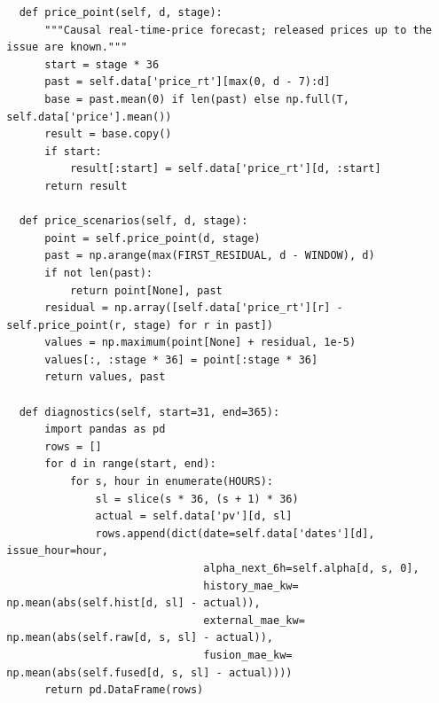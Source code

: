 \begin{verbatim}
    def price_point(self, d, stage):
        """Causal real-time-price forecast; released prices up to the
  issue are known."""
        start = stage * 36
        past = self.data['price_rt'][max(0, d - 7):d]
        base = past.mean(0) if len(past) else np.full(T,
  self.data['price'].mean())
        result = base.copy()
        if start:
            result[:start] = self.data['price_rt'][d, :start]
        return result

    def price_scenarios(self, d, stage):
        point = self.price_point(d, stage)
        past = np.arange(max(FIRST_RESIDUAL, d - WINDOW), d)
        if not len(past):
            return point[None], past
        residual = np.array([self.data['price_rt'][r] -
  self.price_point(r, stage) for r in past])
        values = np.maximum(point[None] + residual, 1e-5)
        values[:, :stage * 36] = point[:stage * 36]
        return values, past

    def diagnostics(self, start=31, end=365):
        import pandas as pd
        rows = []
        for d in range(start, end):
            for s, hour in enumerate(HOURS):
                sl = slice(s * 36, (s + 1) * 36)
                actual = self.data['pv'][d, sl]
                rows.append(dict(date=self.data['dates'][d],
  issue_hour=hour,
                                 alpha_next_6h=self.alpha[d, s, 0],
                                 history_mae_kw=
  np.mean(abs(self.hist[d, sl] - actual)),
                                 external_mae_kw=
  np.mean(abs(self.raw[d, s, sl] - actual)),
                                 fusion_mae_kw=
  np.mean(abs(self.fused[d, s, sl] - actual))))
        return pd.DataFrame(rows)
\end{verbatim}

